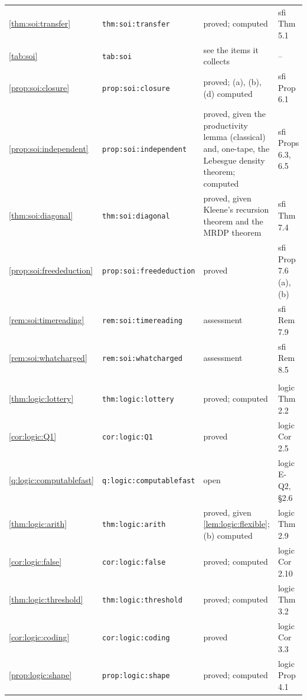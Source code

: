 {\begin{longtable}{@{}>{\raggedright\arraybackslash}p{}>{\raggedright\arraybackslash}p{}>{\raggedright\arraybackslash}p{}>{\raggedright\arraybackslash}p{}@{}}
\cref{thm:soi:transfer} & \texttt{thm:\allowbreak soi:\allowbreak transfer} & proved; computed & sfi Thm 5.1\\
\cref{tab:soi} & \texttt{tab:\allowbreak soi} & see the items it collects & --\\
\cref{prop:soi:closure} & \texttt{prop:\allowbreak soi:\allowbreak closure} & proved; (a), (b), (d) computed & sfi Prop 6.1\\
\cref{prop:soi:independent} & \texttt{prop:\allowbreak soi:\allowbreak independent} & proved, given the productivity lemma (classical) and, one-tape, the Lebesgue density theorem; computed & sfi Props 6.3, 6.5\\
\cref{thm:soi:diagonal} & \texttt{thm:\allowbreak soi:\allowbreak diagonal} & proved, given Kleene's recursion theorem and the MRDP theorem & sfi Thm 7.4\\
\cref{prop:soi:freededuction} & \texttt{prop:\allowbreak soi:\allowbreak freededuction} & proved & sfi Prop 7.6 (a), (b)\\
\cref{rem:soi:timereading} & \texttt{rem:\allowbreak soi:\allowbreak timereading} & assessment & sfi Rem 7.9\\
\cref{rem:soi:whatcharged} & \texttt{rem:\allowbreak soi:\allowbreak whatcharged} & assessment & sfi Rem 8.5\\
\midrule
\multicolumn{4}{@{}l}{\texttt{logic.tex}}\\
\cref{thm:logic:lottery} & \texttt{thm:\allowbreak logic:\allowbreak lottery} & proved; computed & logic Thm 2.2\\
\cref{cor:logic:Q1} & \texttt{cor:\allowbreak logic:\allowbreak Q1} & proved & logic Cor 2.5\\
\cref{q:logic:computablefast} & \texttt{q:\allowbreak logic:\allowbreak computablefast} & open & logic E-Q2, \S2.6\\
\cref{thm:logic:arith} & \texttt{thm:\allowbreak logic:\allowbreak arith} & proved, given \cref{lem:logic:flexible}; (b) computed & logic Thm 2.9\\
\cref{cor:logic:false} & \texttt{cor:\allowbreak logic:\allowbreak false} & proved; computed & logic Cor 2.10\\
\cref{thm:logic:threshold} & \texttt{thm:\allowbreak logic:\allowbreak threshold} & proved; computed & logic Thm 3.2\\
\cref{cor:logic:coding} & \texttt{cor:\allowbreak logic:\allowbreak coding} & proved & logic Cor 3.3\\
\cref{prop:logic:shape} & \texttt{prop:\allowbreak logic:\allowbreak shape} & proved; computed & logic Prop 4.1\\

\end{longtable}}
